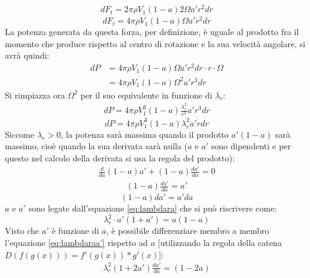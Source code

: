 \begin{align*}
dF_t = 2 \pi \rho V_1 \left( 1- a \right) 2 \Omega a' r^2 dr
\end{align*}
\begin{equation}\label{eq:dftfin}
dF_t = 4 \pi \rho V_1 \left(1-a \right) \Omega a' r^2 dr
\end{equation}
La potenza generata da questa forza, per definizione, è uguale al prodotto fra il momento che produce rispetto al centro di rotazione e la sua velocità angolare, si avrà quindi:
\begin{align*}
dP &= 4 \pi \rho V_1 \left( 1-a \right) \Omega a' r^2 dr \cdot r \cdot \Omega \\
&= 4 \pi \rho V_1 \left( 1-a \right) \Omega^2 a' r^3 dr
\end{align*}
Si rimpiazza ora $\Omega^2$ per il suo equivalente in funzione di $\lambda_r$:
\begin{align*}
dP = 4 \pi \rho V_1^3 \left( 1- a \right) \frac{\lambda_r^2}{r^2} a' r^3 dr
\end{align*}
\begin{equation}\label{eq:dP}
dP = 4 \pi \rho V_1^3 \left( 1 - a \right) \lambda_r^2 a' r dr
\end{equation}
Siccome $\lambda_r > 0$, la potenza sarà massima quando il prodotto $a' \left( 1- a \right)$ sarà massimo, cioè quando la sua derivata sarà nulla ($a$ e $a'$ sono dipendenti e per questo nel calcolo della derivata si usa la regola del prodotto):
\begin{align*}
\frac{d}{da} \left( 1-a \right) a' + \left( 1 -a \right) \frac{da'}{da} = 0
\end{align*}
\begin{align*}
\left( 1- a \right) \frac{da'}{da} = a'
\end{align*}
\begin{equation}\label{eq:aa'}
\left(1 - a \right) da' = a' da
\end{equation}
$a$ e $a'$ sono legate dall'equazione \ref{eq:lambdara} che si può riscrivere come:
\begin{equation}\label{eq:lambdaraa'}
\lambda_r^2 \cdot a' \left( 1+ a' \right) = a \left( 1 - a \right)
\end{equation}
Visto che $a'$ è funzione di $a$, è possibile differenziare membro a membro l'equazione \ref{eq:lambdaraa'} rispetto ad $a$ [utilizzando la regola della catena $D(f(g(x)))=f'(g(x))*g'(x)$]:
\begin{align*}
\lambda_r^2 \left( 1+ 2a' \right) \frac{da'}{da} = \left( 1 - 2a \right)
\end{align*}
